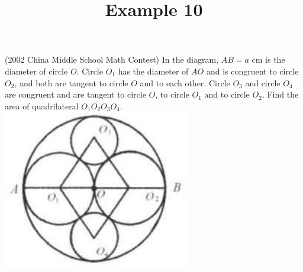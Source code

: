\documentclass{article}
\title{Example 10}
\date{}
\begin{document}
\maketitle

(2002 China Middle School Math Contest) In the diagram, \(A B=a\) cm is the diameter of circle \(O\). Circle \(O_{1}\) has the diameter of \(A O\) and is congruent to circle \(O_{2}\), and both are tangent to circle \(O\) and to each other. Circle \(O_{3}\) and circle \(O_{4}\) are congruent and are tangent to circle \(O\), to circle \(O_{1}\) and to circle \(O_{2}\). Find the area of quadrilateral \(O_{1} O_{2} O_{3} O_{4}\).\\
\centering
\includegraphics[width=\textwidth]{images/problem_image_1.jpg}
\end{document}

